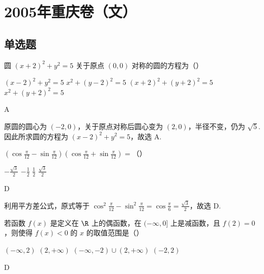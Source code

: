 \chapter{2005年重庆卷（文）}
\section{单选题}
\begin{problem}
圆 \((x + 2)^{2} + y^{2} = 5\) 关于原点 \((0,0)\) 对称的圆的方程为（\quad）

\choices
    {\((x - 2)^{2} + y^{2} = 5\)}
    {\(x^{2} + (y - 2)^{2} = 5\)}
    {\((x + 2)^{2} + (y + 2)^{2} = 5\)}
    {\(x^{2} + (y + 2)^{2} = 5\)}
\end{problem}

\begin{answer}
A
\end{answer}

\begin{solution}
原圆的圆心为 \((-2,0)\)，关于原点对称后圆心变为 \((2,0)\)，半径不变，仍为 \(\sqrt{5}\). 因此所求圆的方程为 \((x-2)^2+y^2=5\)，故选 A.
\end{solution}

\begin{problem}
\(\left(\cos \frac{\pi}{12} - \sin \frac{\pi}{12}\right)\left(\cos \frac{\pi}{12} + \sin \frac{\pi}{12}\right)=\)（\quad）

\choices
    {\(-\frac{\sqrt{3}}{2}\)}
    {\(-\frac{1}{2}\)}
    {\(\frac{1}{2}\)}
    {\(\frac{\sqrt{3}}{2}\)}
\end{problem}

\begin{answer}
D
\end{answer}

\begin{solution}
利用平方差公式，原式等于 \(\cos^2\frac{\pi}{12}-\sin^2\frac{\pi}{12}=\cos\frac{\pi}{6}=\frac{\sqrt{3}}{2}\)，故选 D.
\end{solution}

\begin{problem}
若函数 \( f(x) \) 是定义在 \( \R \) 上的偶函数，在 \((- \infty, 0]\) 上是减函数，且 \( f(2) = 0 \)，则使得 \( f(x) < 0 \) 的 \( x \) 的取值范围是（\quad）

\choices
    {\((-\infty, 2)\)}
    {\((2, +\infty)\)}
    {\((-\infty, -2) \cup (2, +\infty)\)}
    {\((-2, 2)\)}
\end{problem}

\begin{answer}
D
\end{answer}

